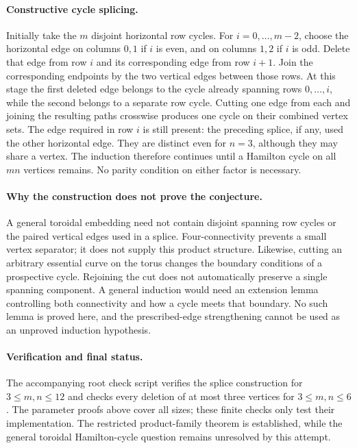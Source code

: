 \documentclass[11pt,a4paper]{article}
\begin{document}
\paragraph{Constructive cycle splicing.}
Initially take the $m$ disjoint horizontal row cycles. For
$i=0,\ldots,m-2$, choose the horizontal edge on columns $0,1$ if
$i$ is even, and on columns $1,2$ if $i$ is odd. Delete that edge
from row $i$ and its corresponding edge from row $i+1$. Join the
corresponding endpoints by the two vertical edges between those rows.
At this stage the first deleted edge belongs to the cycle already
spanning rows $0,\ldots,i$, while the second belongs to a separate
row cycle. Cutting one edge from each and joining the resulting paths
crosswise produces one cycle on their combined vertex sets.
The edge required in row $i$ is still present: the preceding splice,
if any, used the other horizontal edge. They are distinct even for
$n=3$, although they may share a vertex. The induction therefore
continues until a Hamilton cycle on all $mn$ vertices remains.
No parity condition on either factor is necessary.

\paragraph{Why the construction does not prove the conjecture.}
A general toroidal embedding need not contain disjoint spanning row
cycles or the paired vertical edges used in a splice. Four-connectivity
prevents a small vertex separator; it does not supply this product
structure. Likewise, cutting an arbitrary essential curve on the
torus changes the boundary conditions of a prospective cycle. Rejoining
the cut does not automatically preserve a single spanning component.
A general induction would need an extension lemma controlling both
connectivity and how a cycle meets that boundary. No such lemma is
proved here, and the prescribed-edge strengthening cannot be used
as an unproved induction hypothesis.

\paragraph{Verification and final status.}
The accompanying root check script verifies the splice construction for
$3\le m,n\le12$ and checks every deletion of at most three vertices
for $3\le m,n\le6$. The parameter proofs above cover all sizes;
these finite checks only test their implementation. The restricted
product-family theorem is established, while the general toroidal
Hamilton-cycle question remains unresolved by this attempt.
\end{document}
